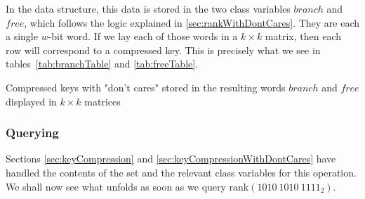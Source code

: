 In the data structure, this data is stored in the two class variables $branch$ and $free$, which follows the logic explained in \ref{sec:rankWithDontCares}. They are each a single $w$-bit word. If we lay each of those words in a $k \times k$ matrix, then each row will correspond to a compressed key. This is precisely what we see in tables~\ref{tab:branchTable} and \ref{tab:freeTable}.

\begin{table}[H]
\centering

\caption{Compressed keys with "don't cares" stored in the resulting words $branch$ and $free$ displayed in $k \times k$ matrices}

\end{table}

% 

\subsubsection{Querying} \label{sec:rankDontCaresQuery}

Sections \ref{sec:keyCompression} and \ref{sec:keyCompressionWithDontCares} have handled the contents of the set and the relevant class variables for this operation. We shall now see what unfolds as soon as we query $\text{rank}(1010\ 1010\ 1111_2)$.

